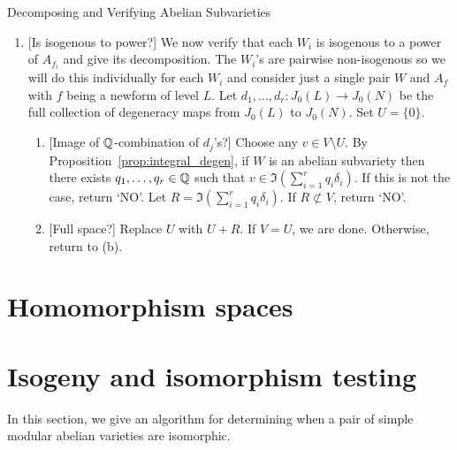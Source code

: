 \documentclass[11pt, proquest]{uwthesis}
\begin{document}
\begin{algorithm}{Decomposing and Verifying Abelian Subvarieties}
\begin{enumerate}
\begin{enumerate}
                    $k$ so let $S_{j,k}=\{f_k\}$ and $W_k=U_{j,k}$.
            \end{enumerate}
        \item{} [Is isogenous to power?]
            We now verify that each $W_i$ is isogenous to a power of $A_{f_i}$
            and give its decomposition. The $W_i$'s are pairwise non-isogenous
            so we will do this individually for each $W_i$ and consider just a
            single pair $W$ and $A_f$ with $f$ being a newform of level $L$.
            Let $d_1,\ldots,d_r:J_0(L)\to J_0(N)$ be the full collection of
            degeneracy maps from $J_0(L)$ to $J_0(N)$.  Set $U=\{0\}$.
            \begin{enumerate}
                \item{} [Image of $\mathbb{Q}$-combination of $d_j$'s?]
                    Choose any $v\in V\setminus U$. By
                    Proposition~\ref{prop:integral_degen}, if $W$ is an abelian
                    subvariety then there exists $q_1,\ldots,q_r\in \mathbb{Q}$
                    such that $v\in \Im \left(\sum_{i=1} ^r q_i
                    \delta_i\right)$. If this is not the case, return
                    `NO'. Let $R = \Im \left(\sum_{i=1} ^r q_i
                    \delta_i\right)$. If $R\not\subset V$, return `NO'.
                \item{} [Full space?]
                    Replace $U$ with $U+R$. If $V=U$, we are done. Otherwise,
                    return to (b).
            \end{enumerate}
    \end{enumerate}
\end{algorithm}


\section{Homomorphism spaces}

\section{Isogeny and isomorphism testing}

In this section, we give an algorithm for determining when a pair of simple
modular abelian varieties are isomorphic.
\end{document}
